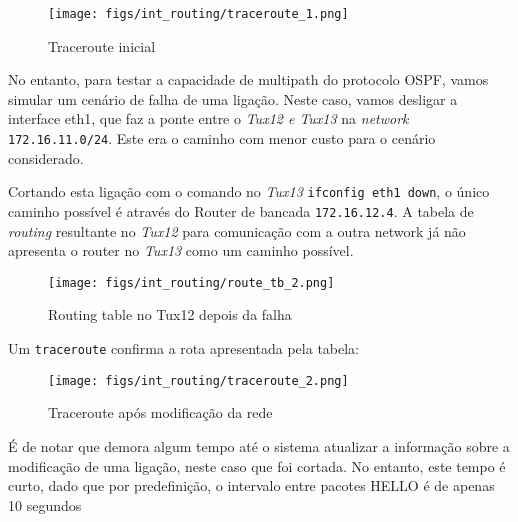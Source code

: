 \begin{figure}[H]
    \centering
    \texttt{[image: figs/int\_routing/traceroute\_1.png]}
    \caption{Traceroute inicial}
    \label{fig:traceroute_1}
\end{figure}

No entanto, para testar a capacidade de multipath do protocolo OSPF, vamos simular um cenário de falha de uma ligação.
Neste caso, vamos desligar a interface eth1, que faz a ponte entre o \textit{Tux12 e Tux13} na \textit{network} \verb|172.16.11.0/24|.
Este era o caminho com menor custo para o cenário considerado.

Cortando esta ligação com o comando no \textit{Tux13} \verb|ifconfig eth1 down|, o único caminho possível é através do Router de bancada \verb|172.16.12.4|.
A tabela de \textit{routing} resultante no \textit{Tux12} para comunicação com a outra network já não apresenta o router no \textit{Tux13} como um caminho possível.

\begin{figure}[H]
    \centering
    \texttt{[image: figs/int\_routing/route\_tb\_2.png]}
    \caption{Routing table no Tux12 depois da falha}
    \label{fig:route_tb_2}
\end{figure}


Um \verb|traceroute| confirma a rota apresentada pela tabela:

\begin{figure}[H]
    \centering
    \texttt{[image: figs/int\_routing/traceroute\_2.png]}
    \caption{Traceroute após modificação da rede}
    \label{fig:traceroute_2}
\end{figure}

É de notar que demora algum tempo até o sistema atualizar a informação sobre a modificação de uma ligação, neste caso que foi cortada.
No entanto, este tempo é curto, dado que por predefinição, o intervalo entre pacotes HELLO é de apenas 10 segundos
